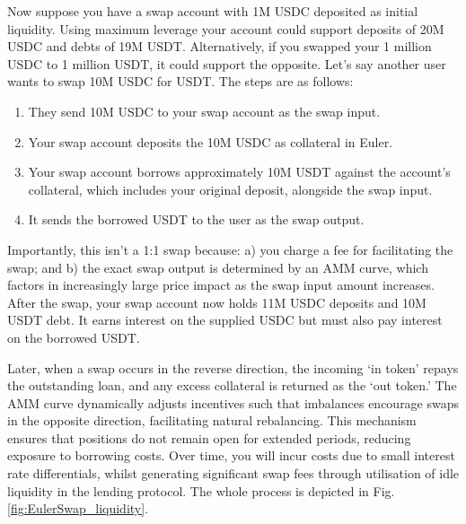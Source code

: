 \documentclass{article}
\begin{document}
Now suppose you have a swap account with 1M USDC deposited as initial liquidity. Using maximum leverage your account could support deposits of 20M USDC and debts of 19M USDT. Alternatively, if you swapped your 1 million USDC to 1 million USDT, it could support the opposite. Let’s say another user wants to swap 10M USDC for USDT. The steps are as follows:

\begin{enumerate}
    \item They send 10M USDC to your swap account as the swap input.
    \item Your swap account deposits the 10M USDC as collateral in Euler.
    \item Your swap account borrows approximately 10M USDT against the account's collateral, which includes your original deposit, alongside the swap input.
    \item It sends the borrowed USDT to the user as the swap output.
\end{enumerate}

\quad
Importantly, this isn’t a 1:1 swap because: a) you charge a fee for facilitating the swap; and b) the exact swap output is determined by an AMM curve, which factors in increasingly large price impact as the swap input amount increases. After the swap, your swap account now holds 11M USDC deposits and 10M USDT debt. It earns interest on the supplied USDC but must also pay interest on the borrowed USDT.

Later, when a swap occurs in the reverse direction, the incoming `in token' repays the outstanding loan, and any excess collateral is returned as the `out token.' The AMM curve dynamically adjusts incentives such that imbalances encourage swaps in the opposite direction, facilitating natural rebalancing. This mechanism ensures that positions do not remain open for extended periods, reducing exposure to borrowing costs. Over time, you will incur costs due to small interest rate differentials, whilst generating significant swap fees through utilisation of idle liquidity in the lending protocol. The whole process is depicted in Fig. \ref{fig:EulerSwap_liquidity}.
\end{document}
